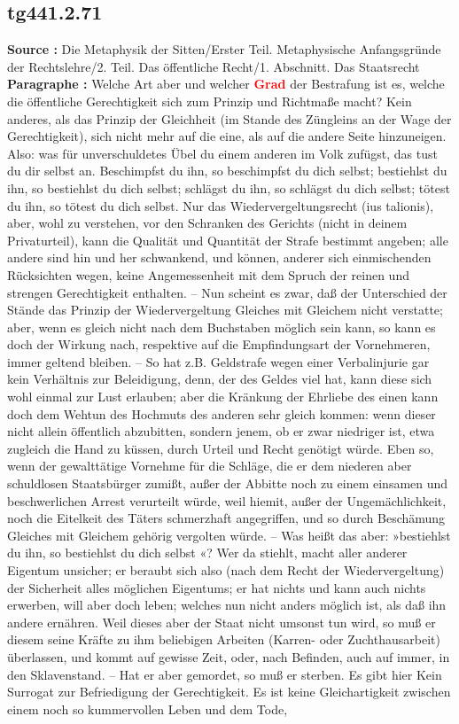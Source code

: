 \documentclass[a4paper,12pt,twoside]{book}
\newcommand{\match}[1]{\textcolor{red}{\textbf{#1}}}
\begin{document}
	\subsection*{tg441.2.71} 
	\textbf{Source : }Die Metaphysik der Sitten/Erster Teil. Metaphysische Anfangsgründe der Rechtslehre/2. Teil. Das öffentliche Recht/1. Abschnitt. Das Staatsrecht\\  
	
	\textbf{Paragraphe : }Welche Art aber und welcher \match{Grad} der Bestrafung ist es, welche die öffentliche Gerechtigkeit sich zum Prinzip und Richtmaße macht? Kein anderes, als das Prinzip der Gleichheit (im Stande des Züngleins an der Wage der Gerechtigkeit), sich nicht mehr auf die eine, als auf die andere Seite hinzuneigen. Also: was für unverschuldetes Übel du einem  anderen im Volk zufügst, das tust du dir selbst an. Beschimpfst du ihn, so beschimpfst du dich selbst; bestiehlst du ihn, so bestiehlst du dich selbst; schlägst du ihn, so schlägst du dich selbst; tötest du ihn, so tötest du dich selbst. Nur das Wiedervergeltungsrecht (ius talionis), aber, wohl zu verstehen, vor den Schranken des Gerichts (nicht in deinem Privaturteil), kann die Qualität und Quantität der Strafe bestimmt angeben; alle andere sind hin und her schwankend, und können, anderer sich einmischenden Rücksichten wegen, keine Angemessenheit mit dem Spruch der reinen und strengen Gerechtigkeit enthalten. – Nun scheint es zwar, daß der Unterschied der Stände das Prinzip der Wiedervergeltung Gleiches mit Gleichem nicht verstatte; aber, wenn es gleich nicht nach dem Buchstaben möglich sein kann, so kann es doch der Wirkung nach, respektive auf die Empfindungsart der Vornehmeren, immer geltend bleiben. – So hat z.B. Geldstrafe wegen einer Verbalinjurie gar kein Verhältnis zur Beleidigung, denn, der des Geldes viel hat, kann diese sich wohl einmal zur Lust erlauben; aber die Kränkung der Ehrliebe des einen kann doch dem Wehtun des Hochmuts des anderen sehr gleich kommen: wenn dieser nicht allein öffentlich abzubitten, sondern jenem, ob er zwar niedriger ist, etwa zugleich die Hand zu küssen, durch Urteil und Recht genötigt würde. Eben so, wenn der gewalttätige Vornehme für die Schläge, die er dem niederen aber schuldlosen Staatsbürger zumißt, außer der Abbitte noch zu einem einsamen und beschwerlichen Arrest verurteilt würde, weil hiemit, außer der Ungemächlichkeit, noch die Eitelkeit des Täters schmerzhaft angegriffen, und so durch Beschämung Gleiches mit Gleichem gehörig vergolten würde. – Was heißt das aber: »bestiehlst du ihn, so bestiehlst du dich selbst «? Wer da stiehlt, macht aller anderer Eigentum unsicher; er beraubt sich also (nach dem Recht der Wiedervergeltung) der Sicherheit alles möglichen Eigentums; er hat nichts und kann auch nichts erwerben, will aber doch leben; welches nun nicht anders möglich ist, als daß ihn andere ernähren. Weil dieses aber der Staat nicht umsonst tun wird, so muß er diesem seine  Kräfte zu ihm beliebigen Arbeiten (Karren- oder Zuchthausarbeit) überlassen, und kommt auf gewisse Zeit, oder, nach Befinden, auch auf immer, in den Sklavenstand. – Hat er aber gemordet, so muß er sterben. Es gibt hier Kein Surrogat zur Befriedigung der Gerechtigkeit. Es ist keine Gleichartigkeit zwischen einem noch so kummervollen Leben und dem Tode, 
\end{document}
